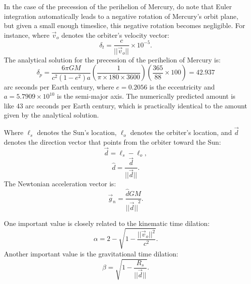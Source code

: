 \documentclass[12pt]{article}
\begin{document}
In the case of the precession of the perihelion of Mercury, do note that Euler integration automatically leads to a negative rotation of Mercury's orbit plane, but given a small enough timeslice, this negative rotation becomes negligible.
For instance, where $\vec{v}_{o}$ denotes the orbiter's velocity vector:
\begin{equation}
\label{dt_other}
\delta_{t} = \frac{c}{\lvert\lvert \vec{v}_{o} \rvert \rvert} \times 10^{-5}.
\end{equation}
The analytical solution for the precession of the perihelion of Mercury is:
\begin{equation}
\label{delta_p}
\delta_{p} = \frac{6 \pi G M}{c^2 (1 - e^2) a} \left( \frac{1}{ \pi \times 180 \times 3600} \right) \left( \frac{365}{88} \times 100 \right) = 42.937
\end{equation}
arc seconds per Earth century, where $e = 0.2056$ is the eccentricity and $a = 5.7909 \times 10^{10}$ is the semi-major axis.
The numerically predicted amount is like $43$ arc seconds per Earth century, which is practically identical to the amount given by the analytical solution.

Where $\ell_s$ denotes the Sun's location, $\ell_o$ denotes the orbiter's location, and $\vec{d}$ denotes the direction vector that points from the orbiter toward the Sun:
\begin{equation}
\label{direction_vector}
\vec{d} = \ell_{s} - \ell_{o},	
\end{equation}
\begin{equation}
\label{direction_unit_vector}
\hat{d} = \frac{\vec{d}}{\lvert\lvert \vec{d} \rvert\rvert}.
\end{equation}
The Newtonian acceleration vector is:
\begin{equation}
\label{newton}
\vec{g}_n = \frac{\hat{d} G M}{{\lvert\lvert \vec{d} \rvert\rvert}^2}.
\end{equation}

One important value is closely related to the kinematic time dilation:
\begin{equation}
\label{eq_kinematic}
\alpha = 2 - \sqrt{1 - \frac{\lvert\lvert \vec{v}_{o}\rvert\rvert^2}{c^2}}.
\end{equation}
Another important value is the gravitational time dilation:
\begin{equation}
\label{eq_gravitational}
\beta = \sqrt{1 - \frac{R_{s}}{\lvert \lvert \vec{d} \rvert \rvert}}.
\end{equation}
\end{document}
